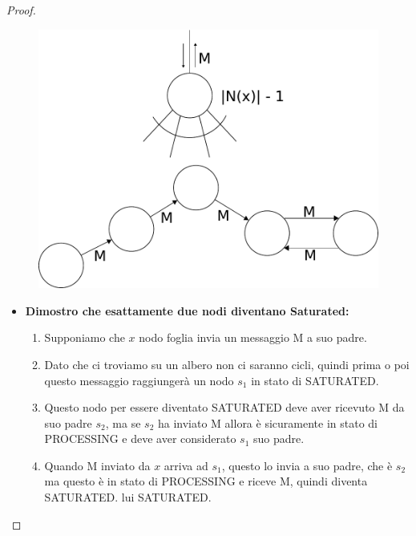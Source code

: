 \begin{proof}
    \ \\
    \begin{figure}[H]
        \centering
        \includegraphics[scale=0.5]{images/n_40}
    \end{figure}

    \begin{itemize}
        \item \textbf{Dimostro che esattamente due nodi diventano Saturated:}
              \begin{enumerate}
                  \item Supponiamo che $x$ nodo foglia invia un messaggio M a suo
                        padre.
                  \item Dato che ci troviamo su un albero non ci saranno cicli, quindi
                        prima o poi questo messaggio raggiungerà un nodo $s_1$ in stato di
                        SATURATED.
                  \item

                        Questo nodo per essere diventato SATURATED deve aver ricevuto
                        M da suo padre $s_2$, ma se $s_2$ ha inviato M allora è
                        sicuramente in stato di PROCESSING e deve aver considerato
                        $s_1$ suo padre.
                  \item Quando M inviato da $x$ arriva ad $s_1$, questo lo invia a suo
                        padre, che è $s_2$ ma questo è in stato di PROCESSING e riceve M,
                        quindi diventa SATURATED.%
                        lui SATURATED.
              \end{enumerate}



\end{itemize}
\end{proof}

